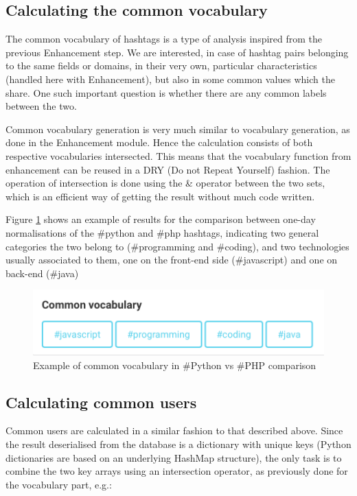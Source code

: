\subsection{Calculating the common vocabulary}
The common vocabulary of hashtags is a type of analysis inspired from the previous Enhancement step. We are interested, in case of hashtag pairs belonging to the same fields or domains, in their very own, particular characteristics (handled here with Enhancement), but also in some common values which the share. One such important question is whether there are any common labels between the two.

Common vocabulary generation is very much similar to vocabulary generation, as done in the Enhancement module. Hence the calculation consists of both respective vocabularies intersected. This means that the vocabulary function from enhancement can be reused in a DRY (Do not Repeat Yourself) fashion. The operation of intersection is done using the \& operator between the two sets, which is an efficient way of getting the result without much code written.

Figure \ref{fig:commonvocab} shows an example of results for the comparison between one-day normalisations of the \#python and \#php hashtags, indicating two general categories the two belong to (\#programming and \#coding), and two technologies usually associated to them, one on the front-end side (\#javascript) and one on back-end (\#java)

\begin{figure}
    \centering
\includegraphics[width=0.5\columnwidth]{img/commonvocab.png}
    \caption{Example of common vocabulary in \#Python vs \#PHP comparison}
    \label{fig:commonvocab}
\end{figure}

\subsection{Calculating common users}
Common users are calculated in a similar fashion to that described above. Since the result deserialised from the database is a dictionary with unique keys (Python dictionaries are based on an underlying HashMap structure), the only task is to combine the two key arrays using an intersection operator, as previously done for the vocabulary part, e.g.:

